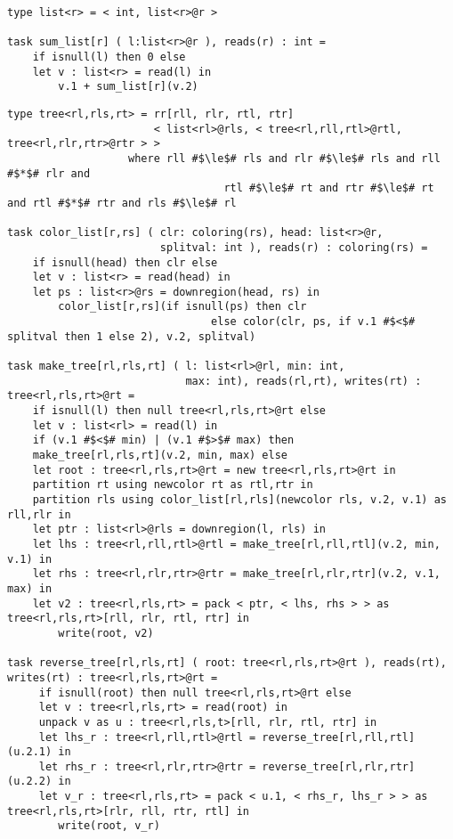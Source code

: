 \begin{lstlisting}[label={lst:linkedlist},caption={Linked List Example}]
type list<r> = < int, list<r>@r >

task sum_list[r] ( l:list<r>@r ), reads(r) : int =
    if isnull(l) then 0 else
    let v : list<r> = read(l) in
        v.1 + sum_list[r](v.2)
\end{lstlisting}

\begin{lstlisting}[float={t},label={lst:treereverse},caption={Tree Partitioning and Reversal Example}]
type tree<rl,rls,rt> = rr[rll, rlr, rtl, rtr] 
                       < list<rl>@rls, < tree<rl,rll,rtl>@rtl, tree<rl,rlr,rtr>@rtr > >
     		       where rll #$\le$# rls and rlr #$\le$# rls and rll #$*$# rlr and 
                                  rtl #$\le$# rt and rtr #$\le$# rt and rtl #$*$# rtr and rls #$\le$# rl

task color_list[r,rs] ( clr: coloring(rs), head: list<r>@r, 
                        splitval: int ), reads(r) : coloring(rs) =
    if isnull(head) then clr else
    let v : list<r> = read(head) in
    let ps : list<r>@rs = downregion(head, rs) in
        color_list[r,rs](if isnull(ps) then clr 
                                else color(clr, ps, if v.1 #$<$# splitval then 1 else 2), v.2, splitval)

task make_tree[rl,rls,rt] ( l: list<rl>@rl, min: int, 
                            max: int), reads(rl,rt), writes(rt) : tree<rl,rls,rt>@rt =
    if isnull(l) then null tree<rl,rls,rt>@rt else 
    let v : list<rl> = read(l) in
    if (v.1 #$<$# min) | (v.1 #$>$# max) then
    make_tree[rl,rls,rt](v.2, min, max) else
    let root : tree<rl,rls,rt>@rt = new tree<rl,rls,rt>@rt in
    partition rt using newcolor rt as rtl,rtr in
    partition rls using color_list[rl,rls](newcolor rls, v.2, v.1) as rll,rlr in
    let ptr : list<rl>@rls = downregion(l, rls) in
    let lhs : tree<rl,rll,rtl>@rtl = make_tree[rl,rll,rtl](v.2, min, v.1) in
    let rhs : tree<rl,rlr,rtr>@rtr = make_tree[rl,rlr,rtr](v.2, v.1, max) in
    let v2 : tree<rl,rls,rt> = pack < ptr, < lhs, rhs > > as tree<rl,rls,rt>[rll, rlr, rtl, rtr] in
        write(root, v2)

task reverse_tree[rl,rls,rt] ( root: tree<rl,rls,rt>@rt ), reads(rt), writes(rt) : tree<rl,rls,rt>@rt =
     if isnull(root) then null tree<rl,rls,rt>@rt else
     let v : tree<rl,rls,rt> = read(root) in
     unpack v as u : tree<rl,rls,t>[rll, rlr, rtl, rtr] in
     let lhs_r : tree<rl,rll,rtl>@rtl = reverse_tree[rl,rll,rtl](u.2.1) in
     let rhs_r : tree<rl,rlr,rtr>@rtr = reverse_tree[rl,rlr,rtr](u.2.2) in
     let v_r : tree<rl,rls,rt> = pack < u.1, < rhs_r, lhs_r > > as tree<rl,rls,rt>[rlr, rll, rtr, rtl] in
        write(root, v_r)
\end{lstlisting}

